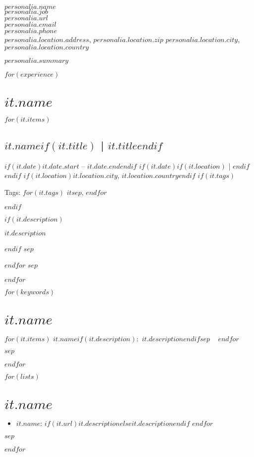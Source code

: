 \documentclass[a4paper,11pt]{article}
\begin{document}
\noindent
{\LARGE\scshape $personalia.name$}\\
$personalia.job$ \\
\href{$personalia.url$}{$personalia.url$} \\
\href{mailto:$personalia.email$}{$personalia.email$} \\
$personalia.phone$ \\
$personalia.location.address$, $personalia.location.zip$ $personalia.location.city$, $personalia.location.country$

{\hspace{\fill}
\begin{minipage}{0.95\textwidth}
    $personalia.summary$
\end{minipage}
}


$for(experience)$
\section*{$it.name$}
$for(it.items)$
\subsection*{\href{$it.url$}{$it.name$}$if(it.title)$ | $it.title$$endif$}
{\footnotesize
$if(it.date)$$it.date.start$ -- $it.date.end$$endif$
$if(it.date)$$if(it.location)$ | $endif$$endif$
$if(it.location)$$it.location.city$, {\scshape $it.location.country$}$endif$
$if(it.tags)$

Tags:
$for(it.tags)$
    \mbox{\bf\sffamily $it$}$sep$,
$endfor$

$endif$
}
$if(it.description)$

{\hspace{\fill}
\begin{minipage}{0.95\textwidth}
$it.description$
\end{minipage}
}
$endif$
$sep$

$endfor$
$sep$

$endfor$


$for(keywords)$
\section*{$it.name$}
\begin{sloppypar}
$for(it.items)$
    {\bf\sffamily $it.name$}$if(it.description)$:~$it.description$$endif$$sep$ ~ 
$endfor$

\end{sloppypar}
$sep$

$endfor$


$for(lists)$
\section*{$it.name$}
\begin{itemize}
$for(it.items)$
    \item {\bf\sffamily $it.name$}: $if(it.url)$\href{$it.url$}{$it.description$}$else$$it.description$$endif$
$endfor$
\end{itemize}
$sep$

$endfor$
\end{document}
